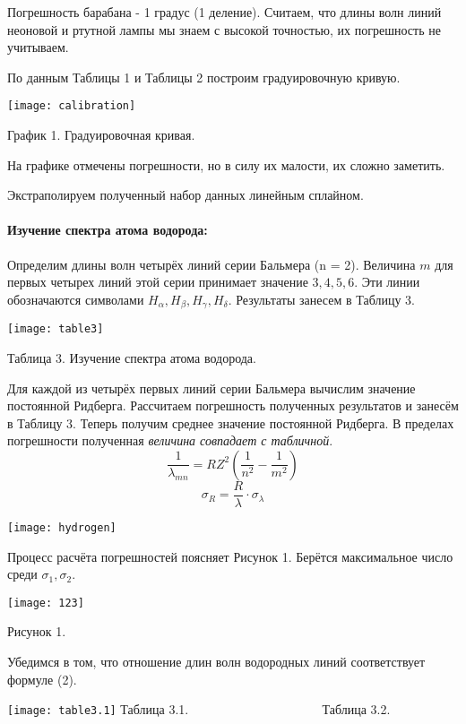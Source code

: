 \documentclass[a4paper,12pt]{article} %
\begin{document}
Погрешность барабана - 1 градус (1 деление).
Считаем, что длины волн линий неоновой и ртутной лампы мы знаем с высокой точностью, их погрешность не учитываем.

По данным Таблицы 1 и Таблицы 2 построим градуировочную кривую.
\begin{center}
\texttt{[image: calibration]}

График 1. Градуировочная кривая.
\end{center}

На графике отмечены погрешности, но в силу их малости, их сложно заметить.

Экстраполируем полученный набор данных линейным сплайном.

\paragraph*{Изучение спектра атома водорода: }

Определим длины волн четырёх линий серии Бальмера (n = 2). Величина $m$ для первых четырех линий этой серии принимает значение $3,4,5,6$. Эти линии обозначаются символами $H_\alpha, H_\beta, H_\gamma, H_\delta$. Результаты занесем в Таблицу 3. 
\begin{center}
\texttt{[image: table3]}

Таблица 3. Изучение спектра атома водорода.
\end{center}

Для каждой из четырёх первых линий серии Бальмера вычислим значение постоянной Ридберга. Рассчитаем погрешность полученных результатов и занесём в Таблицу 3. Теперь получим среднее значение постоянной Ридберга. В пределах погрешности полученная \textit{величина совпадает с табличной}.
\[\frac{1}{\lambda_{mn}} = RZ^2\left(\frac{1}{n^2}-\frac{1}{m^2}\right)\]
\[\sigma_R = \frac{R}{\lambda}\cdot\sigma_{\lambda}\]

\begin{center}
\texttt{[image: hydrogen]}
\end{center}
Процесс расчёта погрешностей поясняет Рисунок 1. Берётся максимальное число среди $\sigma_1, \sigma_2$.
\begin{center}
\texttt{[image: 123]}

Рисунок 1.
\end{center}

Убедимся в том, что отношение длин волн водородных линий соответствует формуле (2).
\begin{center}
\texttt{[image: table3.1]}
Таблица 3.1.         $\qquad\qquad\qquad\qquad\qquad$  Таблица 3.2.
\end{center}
\end{document}
